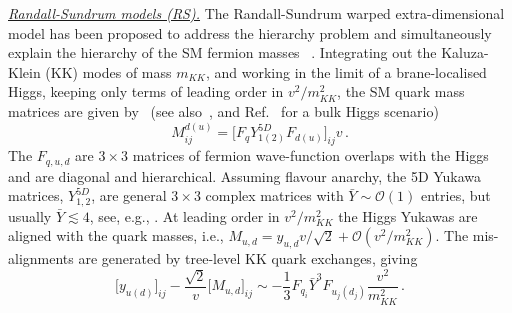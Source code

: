 \documentclass[../report.tex]{subfiles}
\begin{document}
\underline{\it Randall-Sundrum models (RS).}
The Randall-Sundrum warped extra-dimensional model has been proposed to address
the hierarchy problem and simultaneously explain the hierarchy of the SM fermion
masses ~\cite{Randall:1999ee, Gherghetta:2000qt, Grossman:1999ra, Huber:2000ie,
	Huber:2003tu}. Integrating out the Kaluza-Klein (KK) modes of mass $m_{KK}$, and
working in the limit of a brane-localised Higgs, keeping only terms of leading
order in $v^2/m_{KK}^2$, the SM quark mass matrices are given
by~\cite{Azatov:2009na} (see also~\cite{Casagrande:2008hr, Bauer:2009cf,
	Malm:2013jia, Archer:2014jca, Blanke:2008zb, Blanke:2008yr, Albrecht:2009xr,
	Agashe:2006wa, Agashe:2014jca}, and Ref.~\cite{Dillon:2014zea} for a bulk Higgs
scenario) \begin{equation}\label{eq:RS:Mdu} M^{d(u)}_{ij}=\big[F_q
	Y_{1(2)}^{5D}F_{d(u)}\big]_{ij} v\,. \end{equation} The $F_{q,u,d}$ are $3\times
3$ matrices of fermion wave-function overlaps with the Higgs and are diagonal
and hierarchical. Assuming flavour anarchy, the 5D Yukawa matrices,
$Y_{1,2}^{5D}$, are general $3\times 3$ complex matrices with $\bar Y\sim
{\mathcal O}(1)$ entries, but usually $\bar Y \lesssim 4$, see, e.g.,
\cite{Archer:2014jca}. At leading order in $v^2/m_{KK}^2$ the Higgs Yukawas are
aligned with the quark masses, i.e., $M_{u,d}=y_{u,d} v/{\sqrt2}+{\mathcal
	O}(v^2/m_{KK}^2)$. The mis-alignments are generated by tree-level KK quark
exchanges, giving \begin{equation}\label{eq:misalignment}
	\big[y_{u(d)}\big]_{ij}-\frac{\sqrt2}{v}\big[M_{u,d}\big]_{ij}\sim -
	\frac{1}{3}F_{q_i} \bar Y^3 F_{u_j(d_j)}\frac{v^2}{m_{KK}^2}\,. \end{equation}
\end{document}
